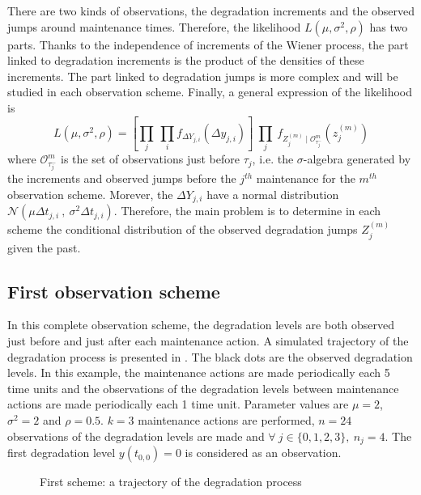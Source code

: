 There are two kinds of observations, the degradation increments and the observed jumps around maintenance times. Therefore, the likelihood $L(\mu,\sigma^2,\rho)$ has two parts. Thanks to the independence of increments of the Wiener process, the part linked to degradation increments is the product of the densities of these increments. The part linked to degradation jumps is more complex and will be studied in each observation scheme. Finally, a general expression of the likelihood is
\begin{equation}
L(\mu,\sigma^2,\rho)= \left[\prod\limits_{j} \ \prod\limits_i f_{\Delta Y_{j,i}} (\Delta y_{j,i}) \right] \ \prod\limits_j\ f_{Z_j^{(m)} \mid \mathcal{O}_{\tau_j^-}^m}(z_j^{(m)})
\label{eq:likelihood}
\end{equation}
\noindent where $\mathcal{O}_{\tau_{j}^-}^m$ is the set of observations just before $\tau_{j}$, i.e. the $\sigma$-algebra generated by the increments and observed jumps before the $j^{th}$ maintenance for the $m^{th}$ observation scheme. Morever, the $\Delta Y_{j,i}$ have a normal distribution $\mathcal{N}(\mu \Delta t_{j,i}\ ,\ \sigma^2 \Delta t_{j,i})$. Therefore, the main problem is to determine in each scheme the conditional distribution of the observed degradation jumps $Z_j^{(m)}$ given the past.


\subsection{First observation scheme}
\label{1case}

In this complete observation scheme, the degradation levels are both observed just before and just after each maintenance action. A simulated trajectory of the degradation process is presented in . The black dots are the observed degradation levels. 
In this example, the maintenance actions are made periodically each 5 time units and the observations of the degradation levels between maintenance actions are made periodically each 1 time unit.  Parameter values are $\mu=2$, $\sigma^2=2$ and $\rho=0.5$. $k=3$ maintenance actions are performed, $n=24$ observations of the degradation levels are made and $\forall\ j \in \{0,1,2,3\},\ n_j=4$. The first degradation level $y(t_{0,0})=0$ is considered as an observation.

\begin{figure}[htbp]
\caption{First scheme: a trajectory of the degradation process}
\label{fig:cas1}
\end{figure}

